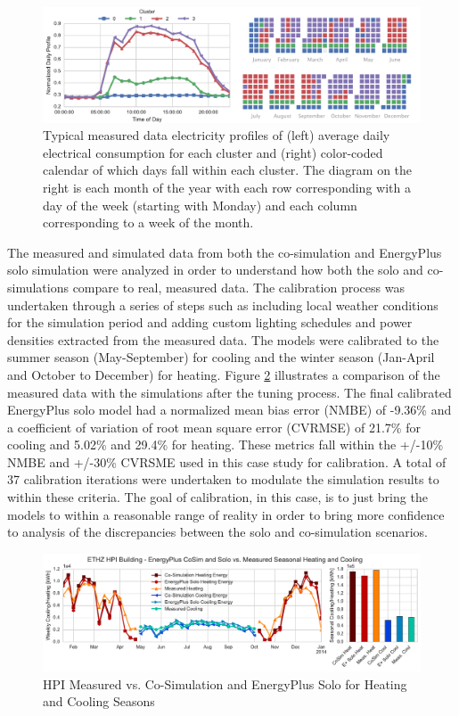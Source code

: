 \documentclass{tBPS2e}
\theoremstyle{plain}
\theoremstyle{definition}
\theoremstyle{remark}
\begin{document}
\begin{figure}[H]
\centering
\includegraphics[scale=0.55]{figures/HPI_combinedclusterandcal_5}
\caption{Typical measured data electricity profiles of (left) average daily electrical consumption for each cluster and (right)
color-coded calendar of which days fall within each cluster. The diagram on the right is each month of the year with each row corresponding with
a day of the week (starting with Monday) and each column corresponding to a week of the month.}
\label{fig:hpi_elec_profiles}
\end{figure}

The measured and simulated data from both the co-simulation and EnergyPlus
solo simulation were analyzed in order to understand how both the solo and co-simulations 
compare to real, measured data. The calibration process was undertaken through a series of steps
such as including local weather conditions for the simulation period and
adding custom lighting schedules and power densities extracted from the
measured data. The models were calibrated to the summer season (May-September)
for cooling and the winter season (Jan-April and October to December) for
heating. Figure \ref{fig:hpi_measvssim} illustrates a comparison of the measured data with the
simulations after the tuning process. The final calibrated EnergyPlus solo
model had a normalized mean bias error (NMBE) of -9.36\% and a coefficient of
variation of root mean square error (CVRMSE) of 21.7\% for cooling and 5.02\%
and 29.4\% for heating. These metrics fall within the +/-10\% NMBE and +/-30\%
CVRSME used in this case study for calibration. A total of 37 calibration iterations were undertaken to modulate the simulation results to within these criteria. The
goal of calibration, in this case, is to just bring the models to within a
reasonable range of reality in order to bring more confidence to analysis of
the discrepancies between the solo and co-simulation
scenarios.


\begin{figure}[H]
\centering
\includegraphics[scale=0.55]{figures/HPI_MeasvsSim}
\caption{HPI Measured vs. Co-Simulation and EnergyPlus Solo for Heating and Cooling Seasons}
\label{fig:hpi_measvssim}
\end{figure}
\end{document}
